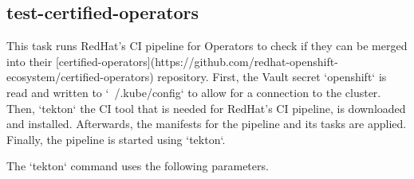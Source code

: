 \subsection{test-certified-operators}\label{subsec:test-certified-operators}

This task runs RedHat's CI pipeline for Operators to check if they can be merged into their [certified-operators](https://github.com/redhat-openshift-ecosystem/certified-operators) repository.
First, the Vault secret `openshift` is read and written to `~/.kube/config` to allow for a connection to the cluster.
Then, `tekton` the CI tool that is needed for RedHat's CI pipeline, is downloaded and installed.
Afterwards, the manifests for the pipeline and its tasks are applied.
Finally, the pipeline is started using `tekton`.

The `tekton` command uses the following parameters.

